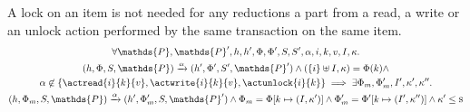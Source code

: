 \lem \label{lem:alman} A lock on an item is not needed for any reductions a part from a read, a write or an unlock action performed by the same transaction on the same item.
\begin{gather*}
	\forall \mathds{P}, \mathds{P}', h, h', \Phi, \Phi', S, S', \alpha, i, k, v, I, \kappa \ldotp \\
	(h, \Phi, S, \mathds{P}) \xrightarrow{\alpha} (h', \Phi', S', \mathds{P}')
		\land
	(\{i\} \uplus I, \kappa) = \Phi(k)
		\land \\
	\alpha \not\in \{ \actread{i}{k}{v}, \actwrite{i}{k}{v}, \actunlock{i}{k} \}
		\implies
	\exists \Phi_m, \Phi_m', I', \kappa', \kappa'' \ldotp \\
	(h, \Phi_m, S, \mathds{P}) \xrightarrow{\alpha} (h', \Phi_m', S, \mathds{P}')
		\land
	\Phi_m = \Phi[k \mapsto (I, \kappa')]
		\land
	\Phi_m' = \Phi'[k \mapsto (I', \kappa'')]
		\land
	\kappa' \leq \textsc{s}
\end{gather*}

